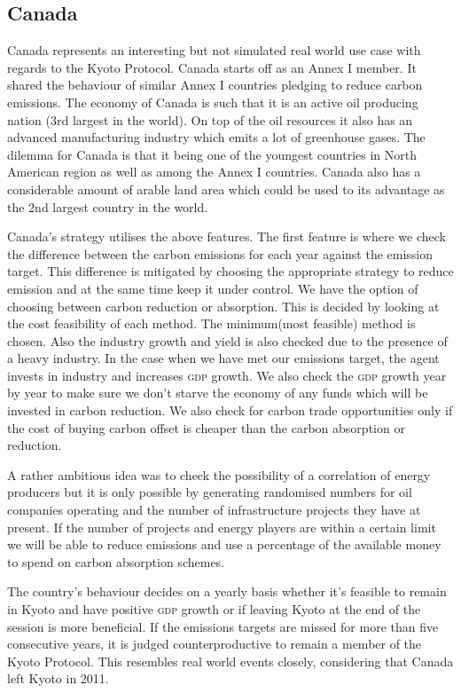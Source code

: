\subsection{Canada}

%
%

Canada represents an interesting but not simulated real world use case with regards to the Kyoto Protocol. Canada starts off as an Annex I member. It shared the behaviour of similar Annex I countries pledging to reduce carbon emissions. The economy of Canada is such that it is an active oil producing nation (3rd largest in the world). On top of the oil resources it also has an advanced manufacturing industry which emits a lot of greenhouse gases. The dilemma for Canada is that it being one of the youngest countries in North American region as well as among the Annex I countries. Canada also has a considerable amount of arable land area which could be used to its advantage as the 2nd largest country in the world.

Canada's strategy utilises the above features. The first feature is where we check the difference between the carbon emissions for each year against the emission target. This difference is mitigated by choosing the appropriate strategy to reduce emission and at the same time keep it under control. We have the option of choosing between carbon reduction or absorption. This is decided by looking at the cost feasibility of each method. The minimum(most feasible) method is chosen. Also the industry growth and yield is also checked due to the presence of a heavy industry. In the case when we have met our emissions target, the agent invests in industry and increases \textsc{gdp} growth. We also check the \textsc{gdp} growth year by year to make sure we don't starve the economy of any funds which will be invested in carbon reduction. We also check for carbon trade opportunities only if the cost of buying carbon offset is cheaper than the carbon absorption or reduction.

A rather ambitious idea was to check the possibility of a correlation of energy producers but it is only possible by generating randomised numbers for oil companies operating and the number of infrastructure projects they have at present. If the number of projects and energy players are within a certain limit we will be able to reduce emissions and use a percentage of the available money to spend on carbon absorption schemes.

The country's behaviour decides on a yearly basis whether it's feasible to remain in Kyoto and have positive \textsc{gdp} growth or if leaving Kyoto at the end of the session is more beneficial. If the emissions targets are missed for more than five consecutive years, it is judged counterproductive to remain a member of the Kyoto Protocol. This resembles real world events closely, considering that Canada left Kyoto in 2011.

